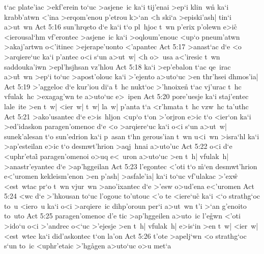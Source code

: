 t`ac
plate'iac
>ekf'erein
to`uc
>asjene~ic
ka`i
tij'enai
>ep`i
klin~wn\r{}
ka`i
krabb'atwn
<'ina
>erqom'enou
p'etrou
k>`an
<h
ski`a
>episki'ash|
tin`i
a>ut~wn\bibvsend
\vs Act 5:16
sun'hrqeto
d`e
ka`i
t`o
pl~hjoc
t~wn
p'erix
p'olewn
e>i\r{c}
<ierousal`hm
vf'erontec
>asjene~ic
ka`i
>oqloum'enouc
<up`o
pneum'atwn
>akaj'artwn
o<'itinec
>ejerape'uonto
<'apantec\bibvsend
\vs Act 5:17
>anast`ac
d`e
<o
>arqiere`uc
ka`i
p'antec
o<i
s`un
a>ut~w|
<h
o>~usa
a<'iresic
t~wn
saddouka'iwn
>epl'hsjhsan
vz'hlou\bibvsend
\vs Act 5:18
ka`i
>ep'ebalon
t`ac
qe~irac
a>u\r{t}~wn
>ep`i
to`uc
>apost'olouc
ka`i
>'ejento
a>uto`uc
>en
thr'hsei
dhmos'ia|\bibvsend
\vs Act 5:19
>'aggeloc
d`e
kur'iou
di`a
\r{t}~hc
nukt`oc
>'hnoixe\r{n}
t`ac
vj'urac
t~hc
vfulak~hc
>exagag'wn
te
a>uto`uc
e>~ipen\bibvsend
\vs Act 5:20
pore'uesje
ka`i
staj'entec
lale~ite
>en
t~w|
<ier~w|
t~w|
la~w|
p'anta
t`a
<r'hmata
t~hc
vzw~hc
ta'uthc\bibvsend
\vs Act 5:21
>ako'usantec
d`e
e>is~hljon
<up`o
t`on
>'orjron
e>ic
t`o
<ier`on
ka`i
>ed'idaskon
paragen'omenoc
d`e
<o
>arqiere`uc
ka`i
o<i
s`un
a>ut~w|
sunek'alesan
t`o
sun'edrion
ka`i
p~asan
t`hn
gerous'ian
t~wn
u<i~wn
>isra`hl
ka`i
>ap'esteilan
e>ic
t`o
desmwt'hrion
>aqj~hnai
a>uto'uc\bibvsend
\vs Act 5:22
o<i
d`e
<uphr'etai\r{}
paragen'omenoi
o>uq
e<~uron
a>uto`uc
>en
t~h|
vfulak~h|
>anastr'eyantec
d`e
>ap'hggeilan\bibvsend
\vs Act 5:23
l'egontec
<'oti
t`o
\r{m}`en
desmwt'hrion
e<'uromen
kekleism'enon
>en
p'ash|
>asfale'ia|
ka`i
to`uc
vf'ulakac
>'exw\r{}
<est~wtac
pr`o
t~wn
vjur~wn
>ano'ixantec
d`e
>'esw
o>ud'ena
e<'uromen\bibvsend
\vs Act 5:24
<wc
d`e
>'hkousan
to`uc
l'ogouc
to'utouc
<'o
te
<iere`uc\r{}
ka`i
<`o
strathg`oc
to~u
<iero~u
ka`i
o<i
>arqiere~ic
dihp'oroun
per`i
a>ut~wn
t'i
>`an
g'enoito
to~uto\bibvsend
\vs Act 5:25
paragen'omenoc
d'e
tic
>ap'hggeilen
a>uto~ic
l'e\r{g}wn
<'oti
>ido`u
o<i
>'andrec
o<`uc
>'ejesje
>en
t~h|
vfulak~h|
e>is`in
>en
t~w|
<ier~w|
<est~wtec
ka`i
did'askontec
t`on
la'on\bibvsend
\vs Act 5:26
t'ote
>apelj`wn
<o
strathg`oc
s`un
to~ic
<uphr'etaic
>'hg\r{a}gen
a>uto`uc
o>u
met`a
